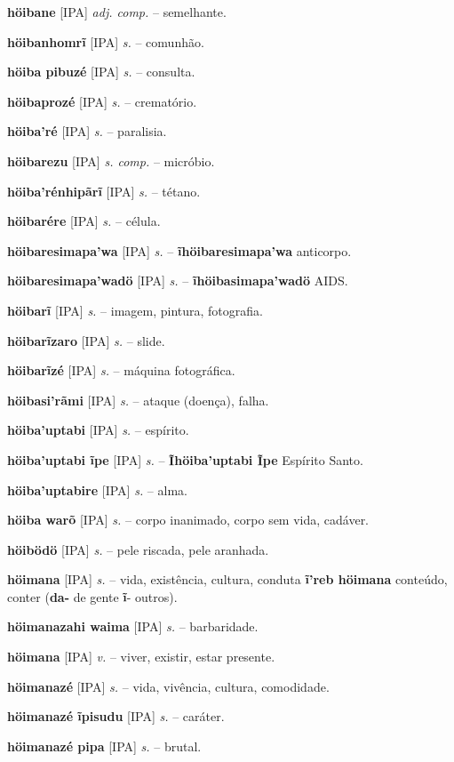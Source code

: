 \textbf{höibane} [IPA] \textit{adj. comp.} -- semelhante.

\textbf{höibanhomrĩ} [IPA] \textit{s.} -- comunhão.

\textbf{höiba pibuzé} [IPA] \textit{s.} -- consulta.

\textbf{höibaprozé} [IPA] \textit{s.} -- crematório.

\textbf{höiba'ré} [IPA] \textit{s.} -- paralisia.

\textbf{höibarezu} [IPA] \textit{s. comp.} -- micróbio.

\textbf{höiba'rénhipãrĩ} [IPA] \textit{s.} -- tétano.

\textbf{höibarére} [IPA] \textit{s.} -- célula.

\textbf{höibaresimapa'wa} [IPA] \textit{s.} -- \textbf{ĩhöibaresimapa'wa} anticorpo.

\textbf{höibaresimapa'wadö} [IPA] \textit{s.} -- \textbf{ĩhöibasimapa'wadö} AIDS.

\textbf{höibarĩ} [IPA] \textit{s.} -- imagem, pintura, fotografia.

\textbf{höibarĩzaro} [IPA] \textit{s.} -- slide.

\textbf{höibarĩzé} [IPA] \textit{s.} -- máquina fotográfica.

\textbf{höibasi'rãmi} [IPA] \textit{s.} -- ataque (doença), falha.

\textbf{höiba'uptabi} [IPA] \textit{s.} -- espírito.

\textbf{höiba'uptabi ĩpe} [IPA] \textit{s.} -- \textbf{Ĩhöiba'uptabi Ĩpe} Espírito Santo.

\textbf{höiba'uptabire} [IPA] \textit{s.} -- alma.

\textbf{höiba warõ} [IPA] \textit{s.} -- corpo inanimado, corpo sem vida, cadáver.

\textbf{höibödö} [IPA] \textit{s.} -- pele riscada, pele aranhada.

\textbf{höimana} [IPA] \textit{s.} -- vida, existência, cultura, conduta  \textbf{ĩ'reb höimana} conteúdo, conter (\textbf{da-} de gente  \textbf{ĩ}- outros).

\textbf{höimanazahi waima} [IPA] \textit{s.} -- barbaridade.

\textbf{höimana} [IPA] \textit{v.} -- viver, existir, estar presente.

\textbf{höimanazé} [IPA] \textit{s.} -- vida, vivência, cultura, comodidade.

\textbf{höimanazé ĩpisudu} [IPA] \textit{s.} -- caráter.

\textbf{höimanazé pipa} [IPA] \textit{s.} -- brutal.

